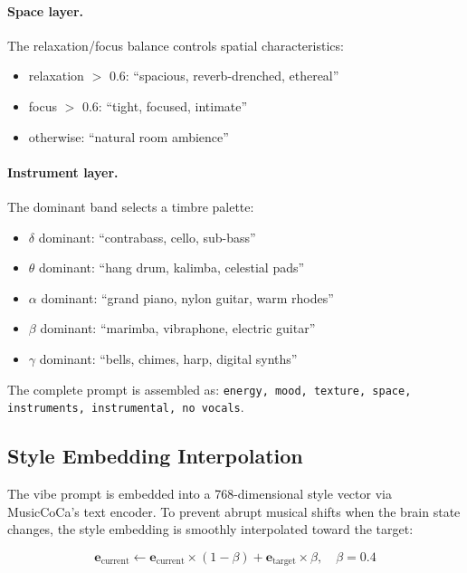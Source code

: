 \documentclass[manuscript,review,anonymous]{acmart}
\begin{document}
\paragraph{Space layer.}
The relaxation/focus balance controls spatial characteristics:
\begin{itemize}[nosep]
  \item relaxation $>$ 0.6: ``spacious, reverb-drenched, ethereal''
  \item focus $>$ 0.6: ``tight, focused, intimate''
  \item otherwise: ``natural room ambience''
\end{itemize}

\paragraph{Instrument layer.}
The dominant band selects a timbre palette:
\begin{itemize}[nosep]
  \item $\delta$ dominant: ``contrabass, cello, sub-bass''
  \item $\theta$ dominant: ``hang drum, kalimba, celestial pads''
  \item $\alpha$ dominant: ``grand piano, nylon guitar, warm rhodes''
  \item $\beta$ dominant: ``marimba, vibraphone, electric guitar''
  \item $\gamma$ dominant: ``bells, chimes, harp, digital synths''
\end{itemize}

The complete prompt is assembled as: \texttt{energy, mood, texture, space, instruments, instrumental, no vocals}.

\subsection{Style Embedding Interpolation}
\label{sec:style-interp}

The vibe prompt is embedded into a 768-dimensional style vector via MusicCoCa's text encoder. To prevent abrupt musical shifts when the brain state changes, the style embedding is smoothly interpolated toward the target:

\begin{equation}
  \mathbf{e}_{\text{current}} \leftarrow \mathbf{e}_{\text{current}} \times (1 - \beta) + \mathbf{e}_{\text{target}} \times \beta, \quad \beta = 0.4
\end{equation}
\end{document}
